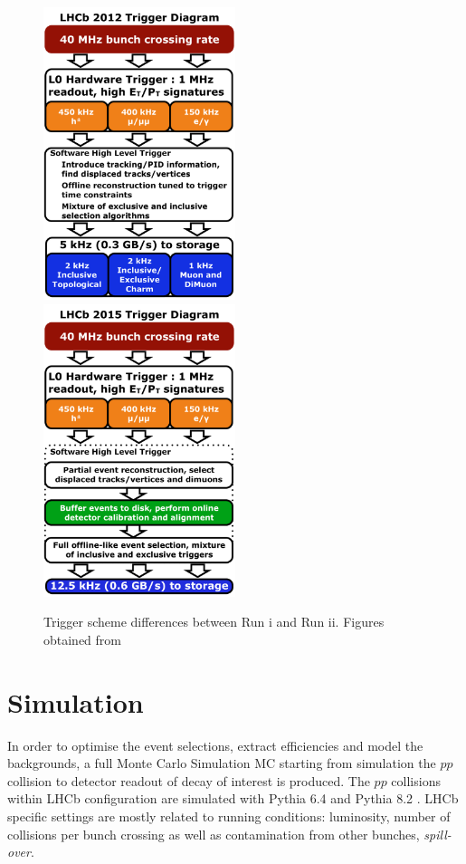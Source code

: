 \begin{figure}[!h]
	\centering
	\includegraphics[width = 0.5\textwidth]{figs/detector/LHCb_Trigger_RunIAlg.pdf}%
	\includegraphics[width = 0.5\textwidth]{figs/detector/LHCb_Trigger_RunII.pdf}%
	\caption{Trigger scheme differences between Run \Rn{1} and Run \Rn{2}. Figures obtained from \cite{triggerscheme}}  
	\label{fig:TriggerChange}
\end{figure}


\section{Simulation}
In order to optimise the event selections, extract efficiencies and model the backgrounds, a full Monte Carlo Simulation \Gls{MC} starting from simulation the $pp$ collision to detector readout of decay of interest is produced. 
The $pp$ collisions within \Gls{LHCb} configuration \cite{Belyaev:2011zza} are simulated with Pythia 6.4 \cite{pythia6} and Pythia 8.2 \cite{pythia8}. \Gls{LHCb} specific settings are mostly related to running conditions: luminosity, number of collisions per bunch crossing as well as contamination from other bunches, \textit{spill-over}. 

